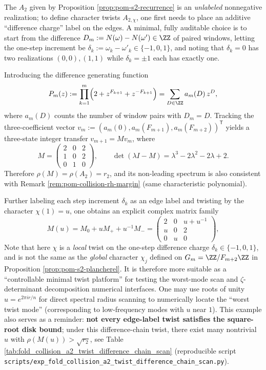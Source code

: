\begin{remark}\label{rem:pom-a2-diffchain-twist}
The \(A_2\) given by Proposition \ref{prop:pom-s2-recurrence} is an \emph{unlabeled} nonnegative realization; to define character twists \(A_{2,\chi}\), one first needs to place an additive ``difference charge'' label on the edges. A minimal, fully auditable choice is to start from the difference
\(
D_m:=N(\omega)-N(\omega')\in\ZZ
\)
of paired windows, letting the one-step increment be \(\delta_k:=\omega_k-\omega'_k\in\{-1,0,1\}\), and noting that \(\delta_k=0\) has two realizations \((0,0),(1,1)\) while \(\delta_k=\pm 1\) each has exactly one.
\par
Introducing the difference generating function
\[
P_m(z):=\prod_{k=1}^m\Bigl(2+z^{F_{k+1}}+z^{-F_{k+1}}\Bigr)=\sum_{D\in\ZZ}a_m(D)\,z^D,
\]
where \(a_m(D)\) counts the number of window pairs with \(D_m=D\). Tracking the three-coefficient vector
\(
v_m:=(a_m(0),a_m(F_{m+1}),a_m(F_{m+2}))^{\mathsf T}
\)
yields a three-state integer transfer \(v_{m+1}=Mv_m\), where
\[
M=
\begin{pmatrix}
2&0&2\\
1&0&2\\
0&1&0
\end{pmatrix},
\qquad
\det(\lambda I-M)=\lambda^3-2\lambda^2-2\lambda+2.
\]
Therefore \(\rho(M)=\rho(A_2)=r_2\), and its non-leading spectrum is also consistent with Remark \ref{rem:pom-collision-rh-margin} (same characteristic polynomial).
\par
Further labeling each step increment \(\delta_k\) as an edge label and twisting by the character \(\chi(1)=u\), one obtains an explicit complex matrix family
\[
M(u)=M_0+uM_++u^{-1}M_-=
\begin{pmatrix}
2&0&u+u^{-1}\\
u&0&2\\
0&u&0
\end{pmatrix},
\]
Note that here \(\chi\) is a \emph{local} twist on the one-step difference charge \(\delta_k\in\{-1,0,1\}\), and is not the same as the \emph{global} character \(\chi_j\) defined on \(G_m=\ZZ/F_{m+2}\ZZ\) in Proposition \ref{prop:pom-s2-plancherel}. It is therefore more suitable as a ``controllable minimal twist platform'' for testing the worst-mode scan and \(\zeta\)-determinant decomposition numerical interfaces.
One may use roots of unity \(u=e^{2\pi i r/n}\) for direct spectral radius scanning to numerically locate the ``worst twist mode'' (corresponding to low-frequency modes with \(u\) near \(1\)). This example also serves as a reminder: \textbf{not every edge-label twist satisfies the square-root disk bound}; under this difference-chain twist, there exist many nontrivial \(u\) with \(\rho(M(u))>\sqrt{r_2}\), see Table \ref{tab:fold_collision_a2_twist_difference_chain_scan} (reproducible script \texttt{scripts/exp\_fold\_collision\_a2\_twist\_difference\_chain\_scan.py}).
\end{remark}

